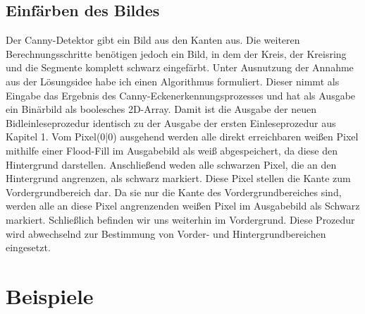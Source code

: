 \subsection{Einfärben des Bildes}
Der Canny-Detektor gibt ein Bild aus den Kanten aus. Die weiteren Berechnungsschritte benötigen jedoch ein Bild, in dem der Kreis, der Kreisring und die Segmente komplett schwarz eingefärbt. Unter Ausnutzung der Annahme aus der Lösungsidee habe ich einen Algorithmus formuliert. Dieser nimmt als Eingabe das Ergebnis des Canny-Eckenerkennungsprozesses und hat als Ausgabe ein Binärbild als boolesches 2D-Array. Damit ist die Ausgabe der neuen Bidleinleseprozedur identisch zu der Ausgabe der ersten Einleseprozedur aus Kapitel 1. 
Vom Pixel(0|0) ausgehend werden alle direkt erreichbaren weißen Pixel mithilfe einer Flood-Fill im Ausgabebild als weiß abgespeichert, da diese den Hintergrund darstellen.
Anschließend weden alle schwarzen Pixel, die an den Hintergrund angrenzen, als schwarz markiert. Diese Pixel stellen die Kante zum Vordergrundbereich dar. Da sie nur die Kante des Vordergrundbereiches sind, werden alle an diese Pixel angrenzenden weißen Pixel im Ausgabebild als Schwarz markiert. Schließlich befinden wir uns weiterhin im Vordergrund. Diese Prozedur wird abwechselnd zur Bestimmung von Vorder- und Hintergrundbereichen eingesetzt.
\section{Beispiele}
